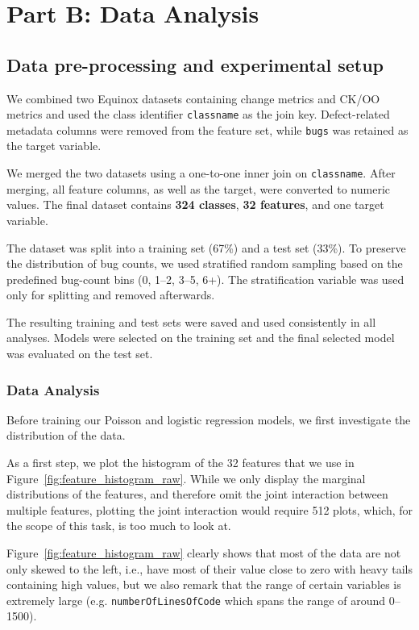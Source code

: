 \chapter{Part B: Data Analysis}

\section{Data pre-processing and experimental setup}

We combined two Equinox datasets containing change metrics and CK/OO metrics and used the class identifier \texttt{classname} as the join key. Defect-related metadata columns were removed from the feature set, while \texttt{bugs} was retained as the target variable.

We merged the two datasets using a one-to-one inner join on \texttt{classname}. After merging, all feature columns, as well as the target, were converted to numeric values. The final dataset contains \textbf{324 classes}, \textbf{32 features}, and one target variable.

The dataset was split into a training set (67\%) and a test set (33\%). To preserve the distribution of bug counts, we used stratified random sampling based on the predefined bug-count bins (0, 1--2, 3--5, 6+). The stratification variable was used only for splitting and removed afterwards.

The resulting training and test sets were saved and used consistently in all analyses. Models were selected on the training set and the final selected model was evaluated on the test set.

\subsection{Data Analysis}

Before training our Poisson and logistic regression models, we first investigate the distribution of the data.

As a first step, we plot the histogram of the 32 features that we use in Figure~\ref{fig:feature_histogram_raw}. While we only display the marginal distributions of the features, and therefore omit the joint interaction between multiple features, plotting the joint interaction would require 512 plots, which, for the scope of this task, is too much to look at.

Figure~\ref{fig:feature_histogram_raw} clearly shows that most of the data are not only skewed to the left, i.e., have most of their value close to zero with heavy tails containing high values, but we also remark that the range of certain variables is extremely large (e.g. \texttt{numberOfLinesOfCode} which spans the range of around 0--1500).

